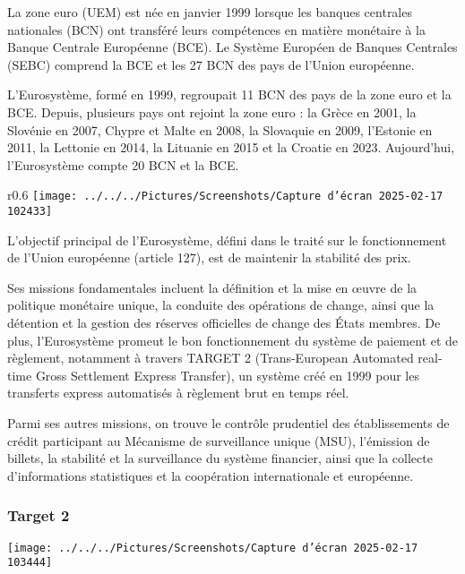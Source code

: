 \documentclass[a4paper, 12pt]{report}
\begin{document}
La zone euro (UEM) est née en janvier 1999 lorsque les banques centrales nationales (BCN) ont transféré leurs compétences en matière monétaire à la Banque Centrale Européenne (BCE). Le Système Européen de Banques Centrales (SEBC) comprend la BCE et les 27 BCN des pays de l'Union européenne. 

L'Eurosystème, formé en 1999, regroupait 11 BCN des pays de la zone euro et la BCE. Depuis, plusieurs pays ont rejoint la zone euro : la Grèce en 2001, la Slovénie en 2007, Chypre et Malte en 2008, la Slovaquie en 2009, l'Estonie en 2011, la Lettonie en 2014, la Lituanie en 2015 et la Croatie en 2023. Aujourd'hui, l'Eurosystème compte 20 BCN et la BCE.
	
\begin{wrapfigure}{r}{0.6\textwidth}
	\centering
\texttt{[image: ../../../Pictures/Screenshots/Capture d'écran 2025-02-17 102433]}
\end{wrapfigure}	
	
L'objectif principal de l'Eurosystème, défini dans le traité sur le fonctionnement de l'Union européenne (article 127), est de maintenir la stabilité des prix. 

Ses missions fondamentales incluent la définition et la mise en œuvre de la politique monétaire unique, la conduite des opérations de change, ainsi que la détention et la gestion des réserves officielles de change des États membres. De plus, l'Eurosystème promeut le bon fonctionnement du système de paiement et de règlement, notamment à travers TARGET 2 (Trans-European Automated real-time Gross Settlement Express Transfer), un système créé en 1999 pour les transferts express automatisés à règlement brut en temps réel. 

Parmi ses autres missions, on trouve le contrôle prudentiel des établissements de crédit participant au Mécanisme de surveillance unique (MSU), l'émission de billets, la stabilité et la surveillance du système financier, ainsi que la collecte d'informations statistiques et la coopération internationale et européenne.

\subsubsection{Target 2}

\begin{center}
	\texttt{[image: ../../../Pictures/Screenshots/Capture d'écran 2025-02-17 103444]}
\end{center}
\end{document}
